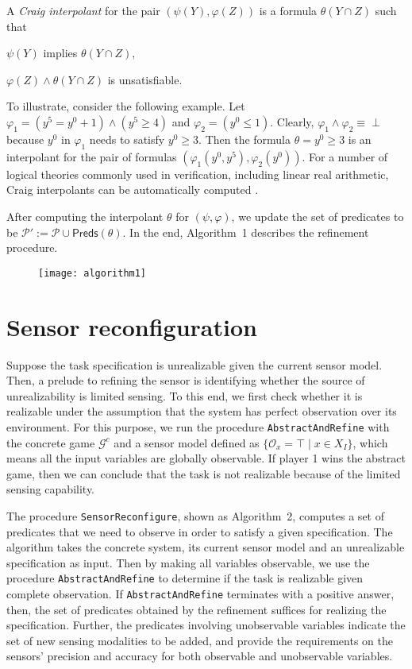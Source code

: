 \documentclass[letterpaper, 10 pt, conference]{ieeeconf}
\begin{document}
A \emph{Craig interpolant} \cite{smullyan1995first} for the pair $(\psi(Y), \varphi(Z) )$ is
a formula $\theta(Y\cap Z)$ such that \begin{inparaenum}
\item $\psi(Y) $ implies $ \theta(Y\cap Z)$,
\item $\varphi(Z) \land\theta (Y \cap Z)$ is unsatisfiable.
\end{inparaenum}
To illustrate, consider the following example. Let $\varphi_1=
(y^5=y^0+1)\land (y^5\ge 4)$ and $ \varphi_2=(y^0\le 1)$. Clearly,
$\varphi_1\land \varphi_2 \equiv \perp$ because $y^0$ in $\varphi_1$ needs
to satisfy $y^0\ge 3$.  Then the formula $\theta = y^0\ge 3$ is an
interpolant for the pair of formulas
$(\varphi_1(y^0,y^5),\varphi_2(y^0))$. For a number of logical
theories commonly used in verification, including linear real
arithmetic, Craig interpolants can be automatically computed
\cite{McMillan2011}.

After computing the interpolant $\theta$ for $(\psi,\varphi)$, we update the set of
predicates to be
$
\mathcal{P}':= \mathcal{P}\cup \mathsf{Preds}(\theta)
$. 
In the end, Algorithm~1 describes
the refinement procedure.
\vspace{-2ex}
\begin{figure}[ht]
\centering
\texttt{[image: algorithm1]}
\label{alg:abstractrefine}
\end{figure}
\vspace{-4ex}

\section{Sensor reconfiguration}
\label{subsec:sensorconf}
Suppose the task specification is unrealizable given the current
sensor model. Then, a prelude to refining the sensor is identifying
whether the source of unrealizability is limited sensing. To this end,
we first check whether it is realizable under the assumption that the
system has perfect observation over its environment. For this purpose,
we run the procedure \texttt{AbstractAndRefine} with the concrete game
$\mathcal{G}^c$ and a sensor model defined as $\{\mathcal{O}_x =\top
\mid x\in X_I\}$, which means all the input variables are globally
observable.  If player 1 wins the abstract game, then we can conclude
that the task is not realizable because of the limited sensing
capability.

The procedure \texttt{SensorReconfigure}, shown as Algorithm~2, computes
a set of predicates that we need to observe in order to
satisfy a given specification. The algorithm takes the concrete
system, its current sensor model and an unrealizable specification as
input. Then by making all variables observable, we use the procedure \texttt{AbstractAndRefine} to determine if the task is realizable given complete observation. If \texttt{AbstractAndRefine} terminates with a positive answer, then, the set of predicates obtained by the refinement suffices for realizing the specification. Further, the predicates involving
unobservable variables indicate the set of new sensing modalities to
be added, and provide the requirements on the sensors'
precision and accuracy for both observable and unobservable variables.
\end{document}
